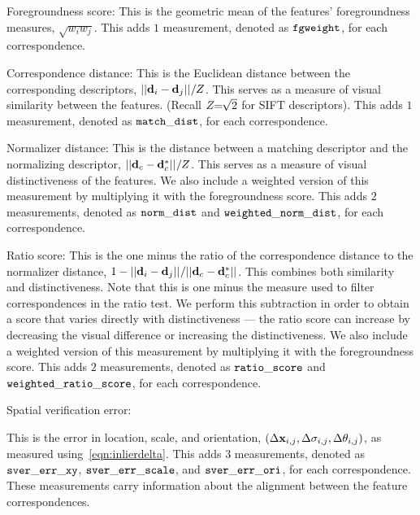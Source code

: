 \begin{itemln}

    \item Foregroundness score:
    This is the geometric mean of the features' foregroundness measures, $\sqrt{w_i w_j}$.
    This adds $1$ measurement, denoted as $\tt{fgweight}$, for each correspondence.

    \item Correspondence distance:
    This is the Euclidean distance between the corresponding descriptors, $||\mathbf{d}_i - \mathbf{d}_j||_{} / Z$.
    This serves as a measure of visual similarity between the features.
    (Recall $Z\mkern-6mu=\mkern-6mu\sqrt{2}$ for SIFT descriptors).
    This adds $1$ measurement, denoted as $\tt{match\_dist}$, for each correspondence.

    \item Normalizer distance:
    This is the distance between a matching descriptor and the normalizing descriptor, %
    $||\mathbf{d}_c - \mathbf{d}^{*}_c||_{} / Z$.
    This serves as a measure of visual distinctiveness of the features.
    We also include a weighted version of this measurement by multiplying it with the foregroundness score.
    This adds $2$ measurements, denoted as $\tt{norm\_dist}$ and $\tt{weighted\_norm\_dist}$, for each
      correspondence.

    \item Ratio score:
    This is the one minus the ratio of the correspondence distance to the normalizer distance, %
    $1 - ||\mathbf{d}_i - \mathbf{d}_j||_{} / ||\mathbf{d}_c - \mathbf{d}^{*}_c||_{}$.
    This combines both similarity and distinctiveness.
    Note that this is one minus the measure used to filter correspondences in the ratio test.
    We perform this subtraction in order to obtain a score that varies directly with distinctiveness --- \ie{}
      the ratio score can increase by decreasing the visual difference or increasing the distinctiveness.
    We also include a weighted version of this measurement by multiplying it with the foregroundness score.
    This adds $2$ measurements, denoted as $\tt{ratio\_score}$ and $\tt{weighted\_ratio\_score}$, for each
      correspondence.
        
    \item Spatial verification error:

        This is the error in location, scale, and orientation, $( %
            \Delta \pt_{i, j}, %
            \Delta \scale_{i, j}, %
        \Delta \ori_{i, j})$, as measured using~\cref{eqn:inlierdelta}.
        This adds $3$ measurements, denoted as $\tt{sver\_err\_xy}$, $\tt{sver\_err\_scale}$, and
          $\tt{sver\_err\_ori}$, for each correspondence.
        These measurements carry information about the alignment between the feature correspondences.


\end{itemln}
